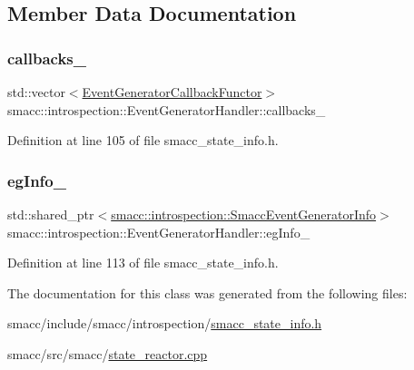 \subsection{Member Data Documentation}
\mbox{\label{classsmacc_1_1introspection_1_1EventGeneratorHandler_ad706c79796082e497b5cfe65eb06eed9}} 
\subsubsection{\texorpdfstring{callbacks\+\_\+}{callbacks\_}}
{\footnotesize\ttfamily std\+::vector$<$\hyperlink{structsmacc_1_1introspection_1_1EventGeneratorCallbackFunctor}{Event\+Generator\+Callback\+Functor}$>$ smacc\+::introspection\+::\+Event\+Generator\+Handler\+::callbacks\+\_\+\hspace{0.3cm}{\ttfamily [private]}}



Definition at line 105 of file smacc\+\_\+state\+\_\+info.\+h.

\mbox{\label{classsmacc_1_1introspection_1_1EventGeneratorHandler_a3109aafe6bd4fd75a69f5b8f5cfe89fb}} 
\subsubsection{\texorpdfstring{eg\+Info\+\_\+}{egInfo\_}}
{\footnotesize\ttfamily std\+::shared\+\_\+ptr$<$\hyperlink{structsmacc_1_1introspection_1_1SmaccEventGeneratorInfo}{smacc\+::introspection\+::\+Smacc\+Event\+Generator\+Info}$>$ smacc\+::introspection\+::\+Event\+Generator\+Handler\+::eg\+Info\+\_\+}



Definition at line 113 of file smacc\+\_\+state\+\_\+info.\+h.



The documentation for this class was generated from the following files\+:\begin{DoxyCompactItemize}
\item 
smacc/include/smacc/introspection/\hyperlink{smacc__state__info_8h}{smacc\+\_\+state\+\_\+info.\+h}\item 
smacc/src/smacc/\hyperlink{state__reactor_8cpp}{state\+\_\+reactor.\+cpp}\end{DoxyCompactItemize}
